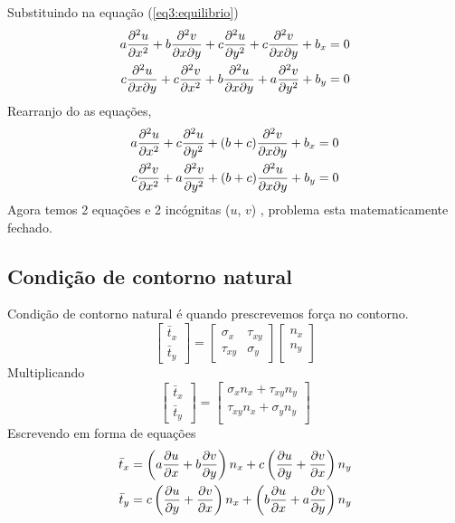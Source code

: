 %
Substituindo na equação (\ref{eq3:equilibrio})
%
\begin{equation}
	\begin{split}
		a \frac{\partial^2 u}{\partial x^2} + b \frac{\partial^2 v}{\partial x \partial y} + c \frac{\partial^2 u}{\partial y^2} + c \frac{\partial^2 v}{\partial x \partial y} + b_x = 0\\
		c \frac{\partial^2 u}{\partial x \partial y} + c \frac{\partial^2 v}{\partial x^2} +  b \frac{\partial^2 u}{\partial x \partial y} + a \frac{\partial^2 v}{\partial y^2}  + b_y = 0		
	\end{split}
\end{equation}
%
Rearranjo do as equações,
%
\begin{equation}
	\begin{split}
		a \frac{\partial^2 u}{\partial x^2} + c \frac{\partial^2 u}{\partial y^2} + (b + c) \frac{\partial^2 v}{\partial x \partial y} + b_x = 0\\
		c \frac{\partial^2 v}{\partial x^2} + a \frac{\partial^2 v}{\partial y^2} + (b + c) \frac{\partial^2 u}{\partial x \partial y} + b_y = 0		
	\end{split}
\end{equation}
%
Agora temos 2 equações e 2 incógnitas ($u$, $v$) , problema esta matematicamente fechado. 

\subsection{Condição de contorno natural}

Condição de contorno natural é quando prescrevemos força no contorno.
%
\begin{equation}
	\begin{bmatrix}
		\bar t_x\\ 
		\bar t_y
	\end{bmatrix}
	=
	\begin{bmatrix}
		\sigma_x & \tau_{xy}\\ 
		\tau_{xy}& \sigma_y 
	\end{bmatrix}
	\begin{bmatrix}
		n_x\\ 
		n_y\\  
	\end{bmatrix}
\end{equation}
%
Multiplicando
%
\begin{equation}
	\begin{bmatrix}
		\bar t_x\\ 
		\bar t_y
	\end{bmatrix}
	=
	\begin{bmatrix}
		\sigma_x n_x + \tau_{xy} n_y\\ 
		\tau_{xy} n_x+ \sigma_y n_y\\  
	\end{bmatrix}
\end{equation}
%
Escrevendo em forma de equações
%
\begin{equation}
	\begin{split}
		\bar t_x =  \left( a \frac{\partial u}{\partial x} + b \frac{\partial v}{\partial y} \right) n_x + c \left(\frac{\partial u}{\partial y} + \frac{\partial v}{\partial x}\right) n_y\\
		\bar t_y = c \left(\frac{\partial u}{\partial y} + \frac{\partial v}{\partial x}\right) n_x + \left( b \frac{\partial u}{\partial x} + a \frac{\partial v}{\partial y} \right) n_y
	\end{split}
\end{equation}
%
